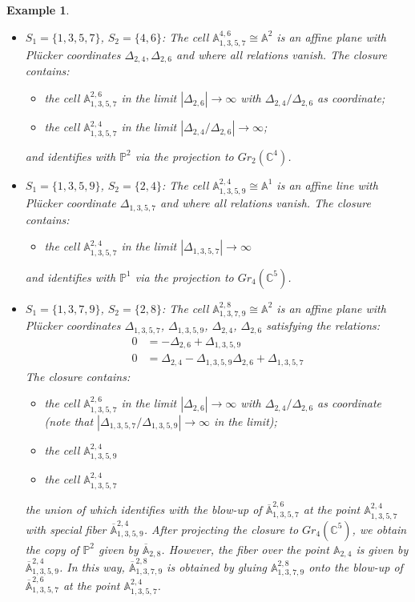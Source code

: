 \documentclass{amsart}
\newtheorem{example}[theorem]{Example}
\numberwithin{equation}{section}
\renewcommand{\AA}{\mathbb{A}}
\newcommand{\CC}{\mathbb{C}}
\newcommand{\PP}{\mathbb{P}}
\begin{document}
\begin{example}
\begin{itemize}
      \item $S_1=\{1,3,5,7\}$, $S_2=\{4,6\}$: The cell $\AA_{1,3,5,7}^{4,6} \cong \AA^2$ is an affine plane with Pl\"ucker coordinates $\Delta_{2,4},\Delta_{2,6}$ and where all relations vanish.
        The closure contains:
        \begin{itemize}
          \item the cell $\AA_{1,3,5,7}^{2,6}$ in the limit $|\Delta_{2,6}|\to\infty$ with $\Delta_{2,4}/\Delta_{2,6}$ as coordinate;
          \item the cell $\AA_{1,3,5,7}^{2,4}$ in the limit $|\Delta_{2,4}/\Delta_{2,6}|\to\infty$;
        \end{itemize}
        and identifies with $\PP^2$ via the projection to $Gr_2(\CC^4)$.

      \item $S_1=\{1,3,5,9\}$, $S_2=\{2,4\}$: The cell $\AA_{1,3,5,9}^{2,4} \cong \AA^1$ is an affine line with Pl\"ucker coordinate $\Delta_{1,3,5,7}$ and where all relations vanish.
        The closure contains:
        \begin{itemize}
          \item the cell $\AA_{1,3,5,7}^{2,4}$ in the limit $|\Delta_{1,3,5,7}|\to\infty$
        \end{itemize}
        and identifies with $\PP^1$ via the projection to $Gr_4(\CC^5)$.

      \item $S_1=\{1,3,7,9\}$, $S_2=\{2,8\}$: The cell $\AA_{1,3,7,9}^{2,8} \cong \AA^2$ is an affine plane with Pl\"ucker coordinates $\Delta_{1,3,5,7}$, $\Delta_{1,3,5,9}$, $\Delta_{2,4}$, $\Delta_{2,6}$ satisfying the relations:
        \begin{align*}
           0 &=  - \Delta_{2,6} + \Delta_{1,3,5,9}\\
           0 &= \Delta_{2,4} - \Delta_{1,3,5,9}\Delta_{2,6} + \Delta_{1,3,5,7}
        \end{align*}
        The closure contains:
        \begin{itemize}
          \item the cell $\AA_{1,3,5,7}^{2,6}$ in the limit $|\Delta_{2,6}|\to\infty$ with $\Delta_{2,4}/\Delta_{2,6}$ as coordinate (note that $|\Delta_{1,3,5,7}/\Delta_{1,3,5,9}|\to\infty$ in the limit);
          \item the cell $\AA_{1,3,5,9}^{2,4}$
          \item the cell $\AA_{1,3,5,7}^{2,4}$
        \end{itemize}
        the union of which identifies with the blow-up of $\overline{\AA}_{1,3,5,7}^{2,6}$ at the point $\AA_{1,3,5,7}^{2,4}$ with special fiber $\overline{\AA}_{1,3,5,9}^{2,4}$.
        After projecting the closure to $Gr_4(\CC^5)$, we obtain the copy of $\PP^2$ given by $\overline{\AA}_{2,8}$.
        However, the fiber over the point $\AA_{2,4}$ is given by $\overline{\AA}_{1,3,5,9}^{2,4}$.
        In this way, $\overline{\AA}_{1,3,7,9}^{2,8}$ is obtained by gluing $\AA_{1,3,7,9}^{2,8}$ onto the blow-up of $\overline{\AA}_{1,3,5,7}^{2,6}$ at the point $\AA_{1,3,5,7}^{2,4}$.


\end{itemize}
\end{example}
\end{document}
